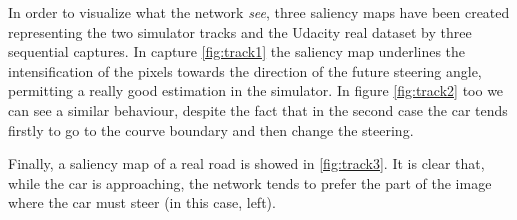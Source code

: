 \documentclass[10pt,twocolumn,letterpaper]{article}
\begin{document}
In order to visualize what the network \textit{see}, three saliency maps have been created  representing the two simulator tracks and the Udacity real dataset by three sequential captures. In capture \ref{fig:track1} the saliency map underlines the intensification of the pixels towards the direction of the future steering angle, permitting a really good estimation in the simulator. In figure \ref{fig:track2} too we can see a similar behaviour, despite the fact that in the second case the car tends firstly to go to the courve boundary and then change the steering.

Finally, a saliency map of a real road is showed in \ref{fig:track3}. It is clear that, while the car is approaching, the network tends to prefer the part of the image where the car must steer (in this case, left).
\vspace{0.5cm}
\end{document}
